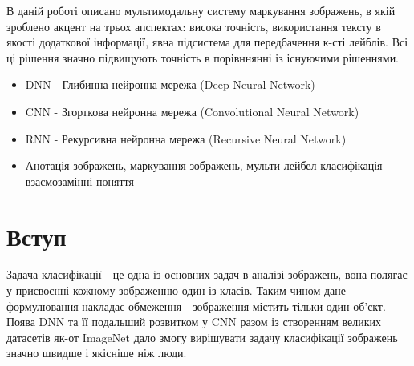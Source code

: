 \documentclass{udstu}
\begin{document}


\abstractUkr

В даній роботі описано мультимодальну систему маркування зображень, в якій зроблено акцент на трьох апспектах:
висока точність, використання тексту в якості додаткової інформації, явна підсистема для передбачення к-сті лейблів.
Всі ці рішення значно підвищують точність в порівннянні із існуючими рішеннями.


\shortings

\begin{itemize}[*]
	\item DNN - Глибинна нейронна мережа (Deep Neural Network)
	\item CNN - Згорткова нейронна мережа (Convolutional Neural Network)
	\item RNN - Рекурсивна нейронна мережа (Recursive Neural Network)
	\item Анотація зображень, маркування зображень, мульти-лейбел класифікація - взаємозамінні поняття
\end{itemize}


\tableofcontents


\chapter{Вступ}

Задача класифікації - це одна із основних задач в аналізі зображень, вона полягає
у присвоєнні кожному зображенню один із класів. Таким чином дане формулювання накладає
обмеження - зображення містить тільки один об'єкт. Поява DNN \cite{dnn-cls}
та її подальший розвитком у CNN \cite{cnn-cls-1,cnn-cls-2} разом із створенням
великих датасетів як-от ImageNet \cite{deng2009imagenet} дало змогу вирішувати задачу
класифікації зображень значно швидше і якісніше ніж люди.
\end{document}
